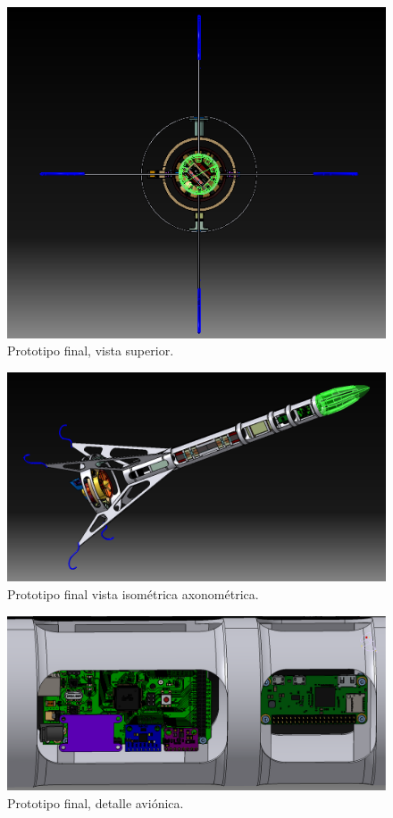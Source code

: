 \begin{figure}[htb]
    \centering
    \includegraphics[height=0.3\pdfpageheight]{fig/design/v6_1}
    \caption{Prototipo final, vista superior.}
    \label{fig:design/v6_1}
\end{figure}


\begin{figure}[htb]
    \centering
    \includegraphics[height=0.3\pdfpageheight]{fig/design/v6_2}
    \caption{Prototipo final vista isométrica axonométrica.}
    \label{fig:design/v6_2}
\end{figure}



\begin{figure}[htb]
    \centering
    \includegraphics[height=0.2\pdfpageheight]{fig/design/v6_4}
    \caption{Prototipo final, detalle aviónica.}
    \label{fig:design/v6_4}
\end{figure}


